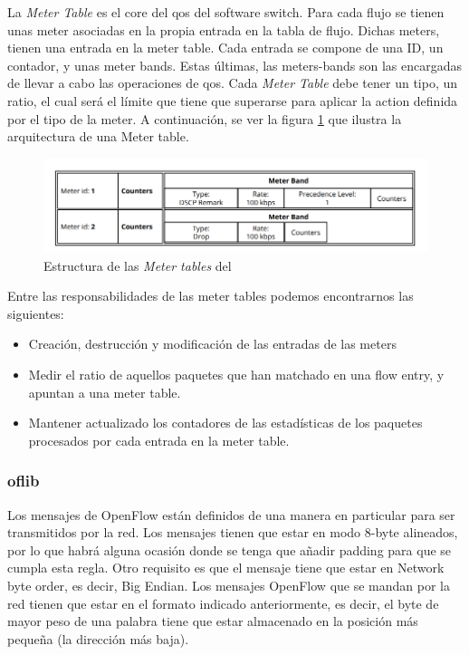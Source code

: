 La \textit{Meter Table} es el core del \gls{qos} del software switch. Para cada flujo se tienen unas meter asociadas en la propia entrada en la tabla de flujo. Dichas meters, tienen una entrada en la meter table. Cada entrada se compone de una ID, un contador, y unas meter bands. Estas últimas, las meters-bands son las encargadas de llevar a cabo las operaciones de \gls{qos}. Cada \textit{Meter Table} debe tener un tipo, un ratio, el cual será el límite que tiene que superarse para aplicar la action definida por el tipo de la meter. A continuación, se ver la figura \ref{fig:bofuss5} que ilustra la arquitectura de una Meter table.

\begin{figure}[ht]
    \centering
    \includegraphics[width=\textwidth]{archivos/img/teoria/bofuss5.png}
    \caption{Estructura de las \textit{Meter tables} del  \cite{fernandes2015software}}
    \label{fig:bofuss5}
\end{figure}

Entre las responsabilidades de las meter tables podemos encontrarnos las siguientes:

\begin{itemize}
    \item Creación, destrucción y modificación de las entradas de las meters
    \item Medir el ratio de aquellos paquetes que han matchado en una flow entry, y apuntan a una meter table.
    \item Mantener actualizado los contadores de las estadísticas de los paquetes procesados por cada entrada en la meter table.
\end{itemize}

\subsubsection{oflib}

Los mensajes de OpenFlow están definidos de una manera en particular para ser transmitidos por la red. Los mensajes tienen que estar en modo 8-byte alineados, por lo que habrá alguna ocasión donde se tenga que añadir padding para que se cumpla esta regla. Otro requisito es que el mensaje tiene que estar en Network byte order, es decir, Big Endian. Los mensajes OpenFlow que se mandan por la red tienen que estar en el formato indicado anteriormente, es decir, el byte de mayor peso de una palabra tiene que estar almacenado en la posición más pequeña (la dirección más baja).\\

